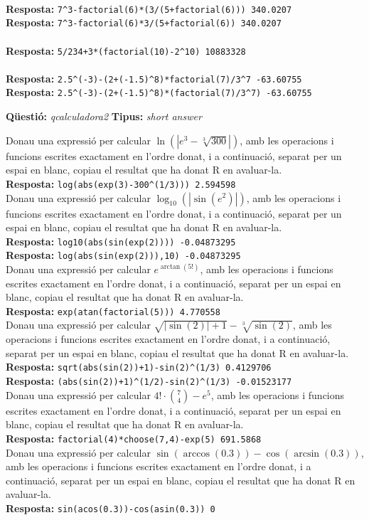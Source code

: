 \documentclass[10pt]{article}
\newcommand{\answer}{\textbf{Resposta: }}
\newcommand{\newquestion}[2]{\noindent\textbf{Qüestió: }\emph{#1} \textbf{Tipus: }\emph{#2}\medskip}
\begin{document}
\\
\answer{\verb?7^3-factorial(6)*(3/(5+factorial(6))) 340.0207?}\\
\answer{\verb?7^3-factorial(6)*3/(5+factorial(6)) 340.0207?}\\

\\
\answer{\verb?5/234+3*(factorial(10)-2^10) 10883328?}\\

\\
\answer{\verb?2.5^(-3)-(2+(-1.5)^8)*factorial(7)/3^7 -63.60755?}\\
\answer{\verb?2.5^(-3)-(2+(-1.5)^8)*(factorial(7)/3^7) -63.60755?}\\

\newpage

\newquestion{qcalculadora2}{short answer} 
\def\qcalculadora2#1{Donau una expressió per calcular $#1$,  amb les operacions i funcions escrites exactament en l'ordre donat, i a continuació, separat per un espai en blanc, copiau el resultat que ha donat R en avaluar-la.}

\qcalculadora2{\ln(|e^3-\sqrt[3]{300}|)}\\
\answer{\verb?log(abs(exp(3)-300^(1/3))) 2.594598?}\\

\qcalculadora2{\log_{10}(|\sin(e^2)|)}\\
\answer{\verb?log10(abs(sin(exp(2)))) -0.04873295?}\\
\answer{\verb?log(abs(sin(exp(2))),10) -0.04873295?}\\

\qcalculadora2{e^{\arctan(5!)}}\\
\answer{\verb?exp(atan(factorial(5))) 4.770558?}\\

\qcalculadora2{\sqrt{|\sin(2)|+1}-\sqrt[3]{\sin(2)}}\\
\answer{\verb?sqrt(abs(sin(2))+1)-sin(2)^(1/3) 0.4129706?}\\
\answer{\verb?(abs(sin(2))+1)^(1/2)-sin(2)^(1/3) -0.01523177?}\\

\qcalculadora2{4!\cdot \binom{7}{4}-e^5}\\
\answer{\verb?factorial(4)*choose(7,4)-exp(5) 691.5868?}\\

\qcalculadora2{\sin(\arccos(0.3))-\cos(\arcsin(0.3))}\\
\answer{\verb?sin(acos(0.3))-cos(asin(0.3)) 0?}\\
\end{document}
